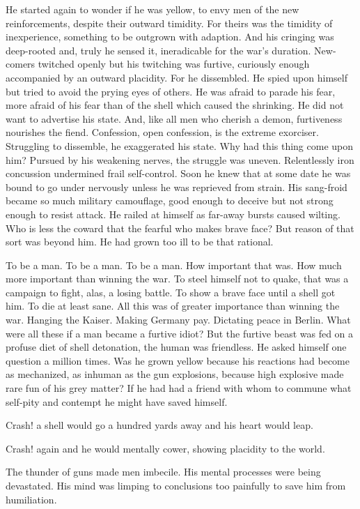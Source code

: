 He started again to wonder if he was yellow, to envy men of the new reinforcements, despite their outward timidity. For theirs was the timidity of inexperience, something to be outgrown with adaption. And his cringing was deep-rooted and, truly he sensed it, ineradicable for the war's duration. New-comers twitched openly but his twitching was furtive, curiously enough accompanied by an outward placidity. For he dissembled. He spied upon himself but tried to avoid the prying eyes of others. He was afraid to parade his fear, more afraid of his fear than of the shell which caused the shrinking. He did not want to advertise his state. And, like all men who cherish a demon, furtiveness nourishes the fiend. Confession, open confession, is the extreme exorciser. Struggling to dissemble, he exaggerated his state. Why had this thing come upon him? Pursued by his weakening nerves, the struggle was uneven. Relentlessly iron concussion undermined frail self-control. Soon he knew that at some date he was bound to go under nervously unless he was reprieved from strain. His sang-froid became so much military camouflage, good enough to deceive but not strong enough to resist attack. He railed at himself as far-away bursts caused wilting. Who is less the coward that the fearful who makes brave face? But reason of that sort was beyond him. He had grown too ill to be that rational.

To be a man. To be a man. To be a man. How important that was. How much more important than winning the war. To steel himself not to quake, that was a campaign to fight, alas, a losing battle. To show a brave face until a shell got him. To die at least sane. All this was of greater importance than winning the war. Hanging the Kaiser. Making Germany pay. Dictating peace in Berlin. What were all these if a man became a furtive idiot? But the furtive beast was fed on a profuse diet of shell detonation, the human was friendless. He asked himself one question a million times. Was he grown yellow because his reactions had become as mechanized, as inhuman as the gun explosions, because high explosive made rare fun of his grey matter? If he had had a friend with whom to commune what self-pity and contempt he might have saved himself.

Crash! a shell would go a hundred yards away and his heart would leap.

Crash! again and he would mentally cower, showing placidity to the world.

The thunder of guns made men imbecile. His mental processes were being devastated. His mind was limping to conclusions too painfully to save him from humiliation.

